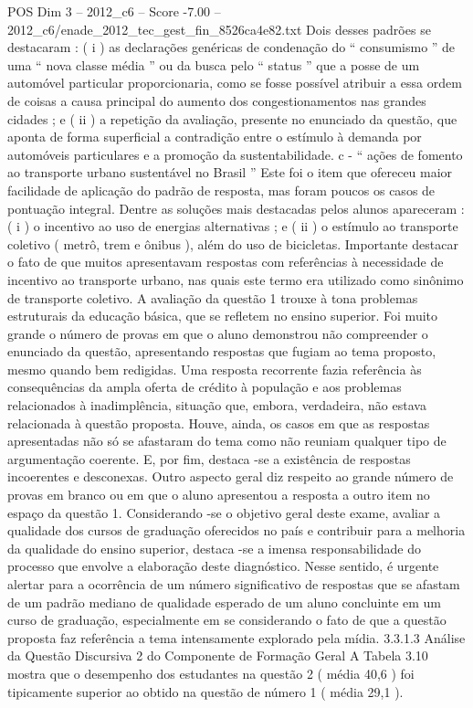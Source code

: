 \begin{textsample}{POS Dim 3 – 2012\_c6 – Score -7.00 – 2012\_c6/enade\_2012\_tec\_gest\_fin\_8526ca4e82.txt}
Dois desses padrões se destacaram : ( i ) as declarações genéricas de condenação do “ consumismo ” de uma “ nova classe média ” ou da busca pelo “ status ” que a posse de um automóvel particular proporcionaria, como se fosse possível atribuir a essa ordem de coisas a causa principal do aumento dos congestionamentos nas grandes cidades ; e ( ii ) a repetição da avaliação, presente no enunciado da questão, que aponta de forma superficial a contradição entre o estímulo à demanda por automóveis particulares e a promoção da sustentabilidade. c - “ ações de fomento ao transporte urbano sustentável no Brasil ” Este foi o item que ofereceu maior facilidade de aplicação do padrão de resposta, mas foram poucos os casos de pontuação integral.
Dentre as soluções mais destacadas pelos alunos apareceram : ( i ) o incentivo ao uso de energias alternativas ; e ( ii ) o estímulo ao transporte coletivo ( metrô, trem e ônibus ), além do uso de bicicletas.
Importante destacar o fato de que muitos apresentavam respostas com referências à necessidade de incentivo ao transporte urbano, nas quais este termo era utilizado como sinônimo de transporte coletivo.
A avaliação da questão 1 trouxe à tona problemas estruturais da educação básica, que se refletem no ensino superior.
Foi muito grande o número de provas em que o aluno demonstrou não compreender o enunciado da questão, apresentando respostas que fugiam ao tema proposto, mesmo quando bem redigidas.
Uma resposta recorrente fazia referência às consequências da ampla oferta de crédito à população e aos problemas relacionados à inadimplência, situação que, embora, verdadeira, não estava relacionada à questão proposta.
Houve, ainda, os casos em que as respostas apresentadas não só se afastaram do tema como não reuniam qualquer tipo de argumentação coerente.
E, por fim, destaca -se a existência de respostas incoerentes e desconexas.
Outro aspecto geral diz respeito ao grande número de provas em branco ou em que o aluno apresentou a resposta a outro item no espaço da questão 1.
Considerando -se o objetivo geral deste exame, avaliar a qualidade dos cursos de graduação oferecidos no país e contribuir para a melhoria da qualidade do ensino superior, destaca -se a imensa responsabilidade do processo que envolve a elaboração deste diagnóstico.
Nesse sentido, é urgente alertar para a ocorrência de um número significativo de respostas que se afastam de um padrão mediano de qualidade esperado de um aluno concluinte em um curso de graduação, especialmente em se considerando o fato de que a questão proposta faz referência a tema intensamente explorado pela mídia. 3.3.1.3 Análise da Questão Discursiva 2 do Componente de Formação Geral A Tabela 3.10 mostra que o desempenho dos estudantes na questão 2 ( média 40,6 ) foi tipicamente superior ao obtido na questão de número 1 ( média 29,1 ).

\end{textsample}

